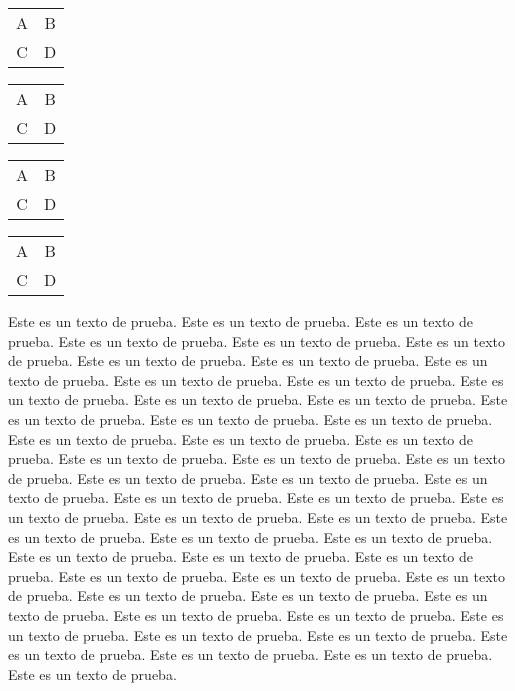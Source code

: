 \documentclass[12pt]{article}
\begin{document}
\vspace*{-2cm}
\begin{tabular}{c|c}
     A & B  \\
     C & D  
\end{tabular}\hfill\begin{tabular}{c|c}
     A & B  \\
     C & D  
\end{tabular}
\vfill
\begin{tabular}{c|c}
     A & B  \\
     C & D  
\end{tabular}\hfill\begin{tabular}{c|c}
     A & B  \\
     C & D  
\end{tabular}
\newpage

\begin{landscape}

\begin{multicols}{3}
Este es un texto de prueba. Este es un texto de prueba. 
Este es un texto de prueba. Este es un texto de prueba. 
Este es un texto de prueba. Este es un texto de prueba.
Este es un texto de prueba. Este es un texto de prueba. 
Este es un texto de prueba. Este es un texto de prueba.
Este es un texto de prueba. Este es un texto de prueba.
Este es un texto de prueba. Este es un texto de prueba. 
Este es un texto de prueba. Este es un texto de prueba. 
Este es un texto de prueba. Este es un texto de prueba.
Este es un texto de prueba. Este es un texto de prueba. 
Este es un texto de prueba. Este es un texto de prueba. 
Este es un texto de prueba. Este es un texto de prueba.
Este es un texto de prueba. Este es un texto de prueba.
Este es un texto de prueba. Este es un texto de prueba.
Este es un texto de prueba. Este es un texto de prueba. 
Este es un texto de prueba. Este es un texto de prueba.
Este es un texto de prueba. Este es un texto de prueba. 
Este es un texto de prueba. Este es un texto de prueba. 
Este es un texto de prueba. Este es un texto de prueba.
Este es un texto de prueba. Este es un texto de prueba. 
Este es un texto de prueba. Este es un texto de prueba.
Este es un texto de prueba. Este es un texto de prueba.
Este es un texto de prueba. Este es un texto de prueba. 
Este es un texto de prueba. Este es un texto de prueba.
Este es un texto de prueba. Este es un texto de prueba. 
Este es un texto de prueba. Este es un texto de prueba. 
\end{multicols}

\end{landscape}
\end{document}
